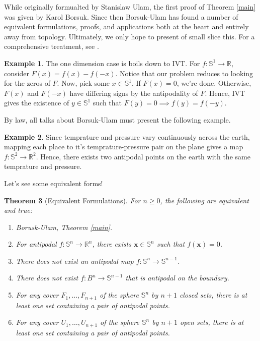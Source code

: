 \documentclass[12pt]{amsart}
\newtheorem{thm}{Theorem}[section]
\theoremstyle{definition}
\newtheorem{ex}[thm]{Example}
\begin{document}
    While originally formualted by Stanislaw Ulam, the first proof of Theorem \ref{main} was given by Karol Borsuk. Since then Borsuk-Ulam has found a number of equivalent formulations, proofs, and applications both at the heart and entirely away from topology. Ultimately, we only hope to present of small slice this. For a comprehensive treatment, see \cite{stein}.

    \begin{ex}
        The one dimension case is boils down to IVT. For $f: \mathbb S^1 \to \mathbb R$, consider $F(x) = f(x) - f(-x)$. Notice that our problem reduces to looking for the zeros of $F$. Now, pick some $x \in \mathbb S^1$. If $F(x) = 0$, we're done. Otherwise, $F(x)$ and $F(-x)$ have differing signs by the antipodality of $F$. Hence, IVT gives the existence of $y \in \mathbb S^1$ such that $F(y) = 0 \implies f(y) = f(-y)$. 
    \end{ex}

    By law, all talks about Borsuk-Ulam must present the following example.

    \begin{ex}
        Since temprature and pressure vary continuously across the earth, mapping each place to it's temprature-pressure pair on the plane gives a map $f: \mathbb S^2 \to \mathbb R^2$. Hence, there exists two antipodal points on the earth with the same temprature and pressure.
    \end{ex}

    Let's see some equivalent forms!

    \begin{thm}[Equivalent Formulations]
        \label{equiv}
        For $n \geq 0$, the following are equivalent and true:
        \begin{enumerate}
            \item Borusk-Ulam, Theorem \ref{main}.
            \item For antipodal $f: \mathbb S^n \to \mathbb R^n$, there exists $\mathbf x \in \mathbb S^n$ such that $f(\mathbf x) = 0$.
            \item There does not exist an antipodal map $f: \mathbb S^n \to \mathbb S^{n-1}$.
            \item There does not exist $f: B^n \to \mathbb S^{n-1}$ that is antipodal on the boundary.
            \item For any cover $F_1,\ldots,F_{n+1}$ of the sphere $\mathbb S^n$ by $n+1$ closed sets, there is at least one set containing a pair of antipodal points.
            \item For any cover $U_1,\ldots,U_{n+1}$ of the sphere $\mathbb S^n$ by $n+1$ open sets, there is at least one set containing a pair of antipodal points.
        \end{enumerate}
    \end{thm}
\end{document}
